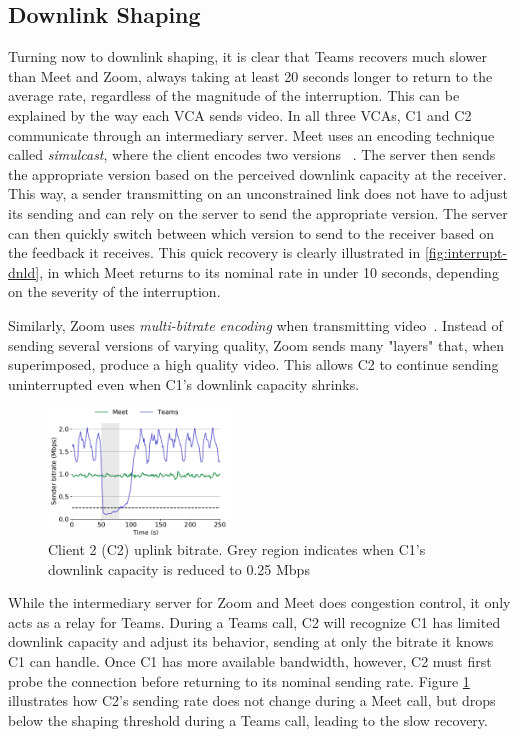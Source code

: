 \subsection{Downlink Shaping}
Turning now to downlink shaping, it is clear that Teams recovers much slower than Meet and Zoom, always taking at least 20 seconds longer to return to the average rate, regardless of the magnitude of the interruption. This can be explained by the way each VCA sends video. In all three VCAs, C1 and C2 communicate through an intermediary server. Meet uses an encoding technique called \textit{simulcast}, where the client encodes two versions ~\cite{nistico2020comparative}. The server then sends the appropriate version based on the perceived downlink capacity at the receiver. This way, a sender transmitting on an unconstrained link does not have to adjust its sending and can rely on the server to send the appropriate version. The server can then quickly switch between which version to send to the receiver based on the feedback it receives. This quick recovery is clearly illustrated in \ref{fig:interrupt-dnld}, in which Meet returns to its nominal rate in under 10 seconds, depending on the severity of the interruption.

Similarly, Zoom uses \textit{multi-bitrate encoding} when transmitting video~\cite{zoom_encoding}. Instead of sending several versions of varying quality, Zoom sends many "layers" that, when superimposed, produce a high quality video. This allows C2 to continue sending uninterrupted even when C1's downlink capacity shrinks. 

\begin{figure}[t]
    \centering
    \includegraphics[width=0.45\textwidth,keepaspectratio]{../figures/interrupt/Interrupt-sender.pdf}
    \caption{Client 2 (C2) uplink bitrate. Grey region indicates when C1's downlink capacity is reduced to 0.25 Mbps}
    \label{fig:interrupt-sender}
\end{figure}

While the intermediary server for Zoom and Meet does congestion control, it only acts as a relay for Teams. During a Teams call, C2 will recognize C1 has limited downlink capacity and adjust its behavior, sending at only the bitrate it knows C1 can handle. Once C1 has more available bandwidth, however, C2 must first probe the connection before returning to its nominal sending rate. Figure \ref{fig:interrupt-sender} illustrates how C2's sending rate does not change during a Meet call, but drops below the shaping threshold during a Teams call, leading to the slow recovery.

